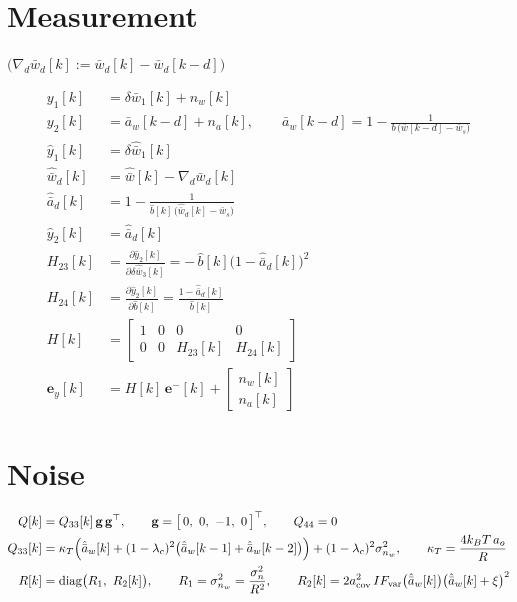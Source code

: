\documentclass[11pt,a4paper,fontset=none]{ctexart}
\newcommand{\ba}{\bar{a}}
\newcommand{\bw}{\bar{w}}
\newcommand{\ah}{\hat{\ba}_w}
\newcommand{\bh}{\hat{b}}
\newcommand{\wh}{\hat{\bw}}
\newcommand{\ad}{\hat{\ba}_d}
\begin{document}
\section{Measurement}

$\bigl(\nabla_d\bw_d[k] := \bw_d[k] - \bw_d[k-d]\bigr)$

\begin{align*}
y_1[k]     &= \delta\bw_1[k] + n_w[k] \\
y_2[k]     &= \ba_w[k-d] + n_a[k], \qquad \ba_w[k-d] = 1 - \frac{1}{b\,\bigl(\bw[k-d] - \bw_s\bigr)} \\
\hat y_1[k] &= \delta\hat{\bw}_1[k] \\
\wh_d[k]    &= \wh[k] - \nabla_d\bw_d[k] \\
\ad[k]      &= 1 - \frac{1}{\bh[k]\,\bigl(\wh_d[k] - \bw_s\bigr)} \\
\hat y_2[k] &= \ad[k] \\
H_{23}[k]  &= \frac{\partial \hat y_2[k]}{\partial \delta\hat{\bw}_3[k]} = -\,\bh[k]\bigl(1-\ad[k]\bigr)^{2} \\
H_{24}[k]  &= \frac{\partial \hat y_2[k]}{\partial \bh[k]} = \frac{1-\ad[k]}{\bh[k]} \\
H[k]       &= \begin{bmatrix} 1 & 0 & 0 & 0 \\ 0 & 0 & H_{23}[k] & H_{24}[k] \end{bmatrix} \\
\mathbf{e}_y[k] &= H[k]\,\mathbf{e}^{-}[k] + \begin{bmatrix} n_w[k] \\ n_a[k] \end{bmatrix}
\end{align*}

\section{Noise}

\begin{align*}
Q[k]    &= Q_{33}[k]\,\mathbf{g}\,\mathbf{g}^{\top}, \qquad
\mathbf{g} = \bigl[\,0,\ 0,\ -1,\ 0\,\bigr]^{\top}, \qquad Q_{44} = 0 \\
Q_{33}[k] &= \kappa_T\Bigl(\ah[k] + (1-\lambda_c)^{2}\bigl(\ah[k-1] + \ah[k-2]\bigr)\Bigr) + (1-\lambda_c)^{2}\sigma^{2}_{n_w},
\qquad \kappa_T = \frac{4k_BT\,a_o}{R} \\
R[k]    &= \mathrm{diag}\bigl(R_1,\ R_2[k]\bigr), \qquad R_1 = \sigma^{2}_{n_w} = \frac{\sigma^{2}_{n}}{R^{2}}, \qquad
R_2[k] = 2a_{\mathrm{cov}}^{2}\,IF_{\mathrm{var}}\bigl(\ah[k]\bigr)\bigl(\ah[k] + \xi\bigr)^{2}
\end{align*}
\end{document}
